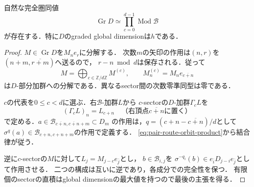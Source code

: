\begin{lemma}
\label{lem:pair-route-sector-equivalence}
自然な完全圏同値
\begin{equation}\label{eq:pair-route-category-product}
 \operatorname{Gr}D\simeq
   \prod_{c=0}^{d-1}\operatorname{Mod}\mathcal B
\end{equation}
が存在する．特に$D$のgraded global dimensionは$h$である．
\end{lemma}
\begin{proof}
$M\in\operatorname{Gr}D$を$M_ne_r$に分解する．
次数$m$の矢印の作用は$(n,r)$を$(n+m,\overline{r+m})$へ送るので，
$r-n\bmod d$は保存される．従って
\begin{equation}
 M=\bigoplus_{c\in\mathbb Z/d\mathbb Z}M^{(c)},\qquad
 M^{(c)}_n=M_ne_{\overline{c+n}}
\end{equation}
は$D$-部分加群への分解である．異なるsector間の次数零準同型は零である．

$c$の代表を$0\leq c<d$に選ぶ．右$\mathcal B$-加群$L$から
$c$-sectorの$D$-加群$\Gamma_cL$を
\begin{equation}
 (\Gamma_cL)_n=L_{c+n}
 \quad\text{（右頂点$\overline{c+n}$に置く）}
\end{equation}
で定める．$a\in\mathcal B_{\overline{c+n},\overline{c+n}+m}\subset D_m$
の作用は，$q=(c+n-\overline{c+n})/d$として
$\sigma^q(a)\in\mathcal B_{c+n,c+n+m}$の作用で定義する．
\eqref{eq:pair-route-orbit-product}から結合律が従う．

逆に$c$-sectorの$M$に対して$L_j=M_{j-c}e_{\bar j}$とし，
$b\in\mathcal B_{i,j}$を
$\sigma^{-q_i}(b)\in e_{\bar i}D_{j-i}e_{\bar j}$として作用させる．
二つの構成は互いに逆であり，各成分での完全性を保つ．
有限個のsectorの直積はglobal dimensionの最大値を持つので最後の主張を得る．
\end{proof}

